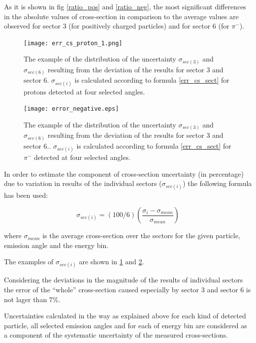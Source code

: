 As it is shown in fig \ref{ratio_pos} and \ref{ratio_neg},   
the most significant differences in the absolute values of cross-section in comparison to the average values are observed for sector 3 (for positively charged particles) and for sector 6 (for $\pi^{-}$).

\begin{figure}[!ht]
    \centering
    \texttt{[image: err\_cs\_proton\_1.png]}%
    \caption{The example of the distribution of the uncertainty $\sigma_{sec(3)}$ and $\sigma_{sec(6)}$ resulting from the deviation of the results for sector 3 and sector 6.
    $\sigma_{sec(i)}$ is calculated according to formula \ref{err_cs_sect} for protons detected at four selected angles.}
    \label{error_cs_proton}
\end{figure}
 
\begin{figure}[!ht]
    \centering
    \texttt{[image: error\_negative.eps]}%
    \caption{The example of the distribution of the uncertainty $\sigma_{sec(3)}$ and $\sigma_{sec(6)}$ resulting from the deviation of the results for sector 3 and sector 6..
    $\sigma_{sec(i)}$ is calculated according to formula \ref{err_cs_sect} for $\pi^{-}$ detected at four selected angles.}
    \label{error_cs_pim}
\end{figure} 
In order to estimate the component of cross-section uncertainty (in percentage) due to variation in results of the individual sectors ($\sigma_{sec(i)}$) the following formula has been used: 

\begin{equation}
\label{err_cs_sect}
\sigma_{sec(i)} = (100/6) (\frac{\sigma_i - \sigma_{mean}}{\sigma_{mean}})    
\end{equation}
 
where $\sigma_{mean}$ is the average cross-section over the sectors for the given particle, emission angle and the energy bin. 

The examples of $\sigma_{sec(i)}$ are shown in 
\ref{error_cs_proton} and \ref{error_cs_pim}. 


Considering the deviations in the magnitude of the results of individual sectors the error of the “whole” cross-section caused especially by sector 3 and sector 6 is not lager than 7\%. 

Uncertainties calculated in the way as explained above for each kind of detected particle, all selected emission angles and for 
each of energy bin
are considered as a component of the systematic uncertainty of the measured cross-sections.




